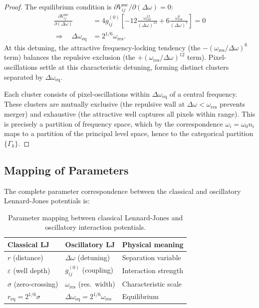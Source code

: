\documentclass[11pt,twocolumn,a4paper]{article}
\begin{document}
\begin{proof}
The equilibrium condition is $\partial V_{ij}^{\text{osc}}/\partial(\Delta\omega) = 0$:
\begin{align}
    \frac{\partial V_{ij}^{\text{osc}}}{\partial(\Delta\omega)} &= 4 g_{ij}^{(0)} \left[ -12 \frac{\omega_{\text{res}}^{12}}{(\Delta\omega)^{13}} + 6 \frac{\omega_{\text{res}}^{6}}{(\Delta\omega)^{7}} \right] = 0 \nonumber \\
    \Rightarrow \quad \Delta\omega_{\text{eq}} &= 2^{1/6} \omega_{\text{res}}.
    \label{eq:lj_equilibrium}
\end{align}
At this detuning, the attractive frequency-locking tendency (the $-(\omega_{\text{res}}/\Delta\omega)^6$ term) balances the repulsive exclusion (the $+(\omega_{\text{res}}/\Delta\omega)^{12}$ term). Pixel-oscillations settle at this characteristic detuning, forming distinct clusters separated by $\Delta\omega_{\text{eq}}$.

Each cluster consists of pixel-oscillations within $\Delta\omega_{\text{eq}}$ of a central frequency. These clusters are mutually exclusive (the repulsive wall at $\Delta\omega < \omega_{\text{res}}$ prevents merger) and exhaustive (the attractive well captures all pixels within range). This is precisely a partition of frequency space, which by the correspondence $\omega_i = \omega_0 n_i$ maps to a partition of the principal level space, hence to the categorical partition $\{\Gamma_k\}$.
\end{proof}

\subsection{Mapping of Parameters}

The complete parameter correspondence between the classical and oscillatory Lennard-Jones potentials is:

\begin{table}[H]
\centering
\caption{Parameter mapping between classical Lennard-Jones and oscillatory interaction potentials.}
\label{tab:lj_mapping}
\begin{tabular}{@{}lll@{}}
\toprule
\textbf{Classical LJ} & \textbf{Oscillatory LJ} & \textbf{Physical meaning} \\
\midrule
$r$ (distance) & $\Delta\omega$ (detuning) & Separation variable \\
$\varepsilon$ (well depth) & $g_{ij}^{(0)}$ (coupling) & Interaction strength \\
$\sigma$ (zero-crossing) & $\omega_{\text{res}}$ (res.~width) & Characteristic scale \\
$r_{\text{eq}} = 2^{1/6}\sigma$ & $\Delta\omega_{\text{eq}} = 2^{1/6}\omega_{\text{res}}$ & Equilibrium \\
\bottomrule
\end{tabular}
\end{table}
\end{document}

